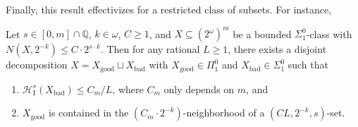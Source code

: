 Finally, this result effectivizes for a restricted class of subsets. For instance,

\begin{corollary}
    \label{corollary:effective_good_bad_decomp_Cantor}
    Let $s \in [0, m] \cap \mathbb{Q}$, $k \in \omega$, $C \geq 1$, and $X \subseteq (2^\omega)^m$ be a bounded $\Sigma^0_1$-class with $N(X, 2^{-k}) \leq C \cdot 2^{s \cdot k}$.
    Then for any rational $L \geq 1$, there exists a disjoint decomposition $X = X_{\operatorname{good}} \sqcup X_{\operatorname{bad}}$ with $X_{\operatorname{good}} \in \Pi^0_1$ and $X_{\operatorname{bad}} \in \Sigma^0_1$ such that
    \begin{enumerate}[label=(\roman*)]
        \item $\mathcal{H}^s_{\operatorname{I}}(X_{\operatorname{bad}}) \leq C_m/L$, where $C_m$ only depends on $m$, and
        \item $X_{\operatorname{good}}$ is contained in the $(C_m \cdot 2^{-k})$-neighborhood of a $(CL, 2^{-k}, s)$-set. 
    \end{enumerate}
\end{corollary}


    
